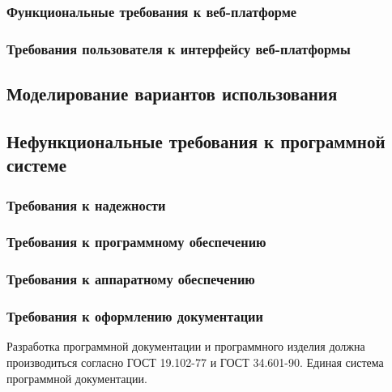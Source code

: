 \subsubsection{Функциональные требования к веб-платформе}

\subsubsection{Требования пользователя к интерфейсу веб-платформы}

\subsection{Моделирование вариантов использования}

\subsection{Нефункциональные требования к программной системе}

\subsubsection{Требования к надежности}

\subsubsection{Требования к программному обеспечению}

\subsubsection{Требования к аппаратному обеспечению}

\subsubsection{Требования к оформлению документации}

Разработка программной документации и программного изделия должна производиться согласно ГОСТ 19.102-77 и ГОСТ 34.601-90. Единая система программной документации.
